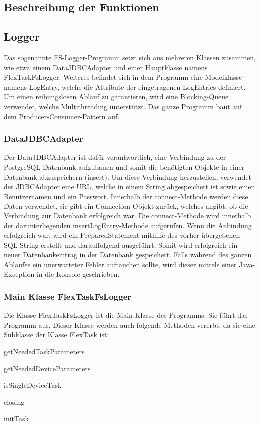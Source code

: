 \subsection{Beschreibung der Funktionen}

\subsection{Logger}
Das sogenannte FS-Logger-Programm setzt sich aus mehreren Klassen zusammen, wie etwa einem DataJDBCAdapter und einer Hauptklasse namens FlexTaskFsLogger. Weiteres befindet sich in dem Programm eine Modelklasse namens LogEntry, welche die Attribute der eingetragenen LogEntries definiert. Um einen reibungslosen Ablauf zu garantieren, wird eine Blocking-Queue verwendet, welche Multithreading unterstützt. Das ganze Programm baut auf dem Producer-Consumer-Pattern auf.	

\subsubsection{DataJDBCAdapter}
Der DataJDBCAdapter ist dafür verantwortlich, eine Verbindung zu der PostgreSQL-Datenbank aufzubauen und somit die benötigten Objekte in einer Datenbank abzuspeichern (insert). Um diese Verbindung herzustellen, verwendet der JDBCAdapter eine URL, welche in einem String abgespeichert ist sowie einen Benutzernamen und ein Passwort. Innerhalb der connect-Methode werden diese Daten verwendet, sie gibt ein Connection-Objekt zurück, welches angibt, ob die Verbindung zur Datenbank erfolgreich war. Die connect-Methode wird innerhalb der darunterliegenden insertLogEntry-Methode aufgerufen. Wenn die Anbindung erfolgreich war, wird ein PreparedStatement mithilfe des vorher übergebenen SQL-String erstellt und darauffolgend ausgeführt. Somit wird erfolgreich ein neuer Datenbankeintrag in der Datenbank gespeichert. Falls während des ganzen Ablaufes ein unerwarteter Fehler auftauchen sollte, wird dieser mittels einer Java-Exception in die Konsole geschrieben.

\subsubsection{Main Klasse FlexTaskFsLogger}
Die Klasse FlexTaskFsLogger ist die Main-Klasse des Programms. Sie führt das Programm aus. Dieser Klasse werden auch folgende Methoden vererbt, da sie eine Subklasse der Klasse FlexTask ist: 
\begin{compactitem}
    \item getNeededTaskParameters
    \item getNeededDeviceParameters
    \item isSingleDeviceTask
    \item closing
    \item initTask
\end{compactitem}

